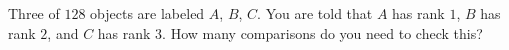 Three of $128$ objects are labeled $A$, $B$, $C$. You are told that $A$ has rank $1$, $B$ has rank $2$, and $C$ has rank $3$. How many comparisons do you need to check this?
